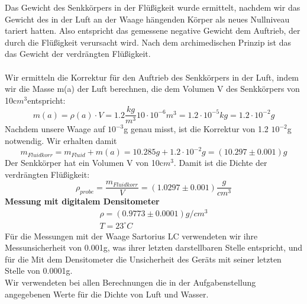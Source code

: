 \documentclass{article}
\begin{document}
Das Gewicht des Senkkörpers in der Flüßigkeit wurde ermittelt, nachdem wir das Gewicht des in der Luft an der Waage hängenden Körper als neues Nullniveau tariert hatten. Also entspricht das gemessene negative Gewicht dem Auftrieb, der durch die Flüßigkeit verursacht wird. Nach dem archimedischen Prinzip ist das das Gewicht der verdrängten Flüßigkeit. \\ 
 \\
Wir ermitteln die Korrektur für den Auftrieb des Senkkörpers in der Luft, indem wir die Masse m(a) der Luft berechnen, die dem Volumen V des Senkkörpers von 10c$m^3$entspricht:
\begin{equation}
m(a)=\rho(a) \cdot V=1.2\frac{kg}{m^3}10\cdot10^{-6}m^3=1.2\cdot 10^{-5}kg=1.2\cdot  10^{-2}g
\end{equation}
Nachdem unsere Waage auf $10^{-3}$g genau misst, ist die Korrektur von 1.2 $10^{-2}$g notwendig. Wir erhalten damit
\begin{equation}
m_{Fluid korr}=m_{Fluid}+m(a)=10.285g+1.2\cdot  10^{-2}g=(10.297 \pm 0.001)g 
\end{equation} 
Der Senkkörper hat ein Volumen V von 10c$m^3$. Damit ist die Dichte der verdrängten Flüßigkeit:
\begin{equation}
\rho_{probe}=\frac{m_{Fluid korr}}{V}=(1.0297 \pm 0.001) \frac{g}{cm^3}
\end{equation}
\textbf{Messung mit digitalem Densitometer}
\begin{gather*}
\rho=(0.9773 \pm 0.0001 )g/cm^3 \\
T=23^{\circ}C
\end{gather*}
Für die Messungen mit der Waage Sartorius LC verwendeten wir ihre Messunsicherheit von 0.001g, was ihrer letzten darstellbaren Stelle entspricht, und für die Mit dem Densitometer die Unsicherheit des Geräts mit seiner letzten Stelle von 0.0001g. \\
Wir verwendeten bei allen Berechnungen die in der Aufgabenstellung angegebenen Werte für die Dichte von Luft und Wasser.

\end{document}
